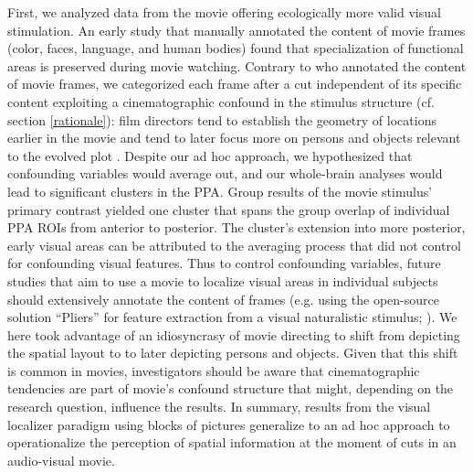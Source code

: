 \documentclass[english]{article}
\begin{document}
First, we analyzed data from the movie offering ecologically more valid visual
stimulation.
%
An early study \citep{bartels2004mapping} that manually annotated the content of
movie frames (color, faces, language, and human bodies) found that
specialization of functional areas is preserved during movie watching.
%
Contrary to \citep{bartels2004mapping} who annotated the content of movie
frames, we categorized each frame after a cut independent of its specific
content
exploiting a cinematographic confound in the stimulus structure (cf. section
\ref{rationale}):
film directors tend to establish the geometry of locations earlier in the movie
and tend to later focus more on persons and objects relevant to the evolved plot
\citep{brown2012cinematography, mercado2011filmmakers}.
Despite our ad hoc approach, we hypothesized that confounding variables would
average out, and our whole-brain analyses would lead to significant clusters in
the PPA.
Group results of the movie stimulus' primary contrast yielded one cluster that
spans the group overlap of individual PPA ROIs from anterior to posterior.
The cluster's extension into more posterior, early visual areas can be
attributed to the averaging process that did not control for confounding visual
features.
Thus to control confounding variables, future studies that aim to use a movie to
localize visual areas in individual subjects should extensively annotate the
content of frames (e.g.  using the open-source solution ``Pliers'' for feature
extraction from a visual naturalistic stimulus; \citep{mcnamara2017developing}).
We here took advantage of an idiosyncrasy of movie directing to shift from
depicting the spatial layout to to later depicting persons and objects.
Given that this shift is common in movies, investigators should be aware that
cinematographic tendencies are part of movie's confound structure that might,
depending on the research question, influence the results.
In summary, results from the visual localizer paradigm using blocks of pictures
generalize to an ad hoc approach to operationalize the perception of spatial
information at the moment of cuts in an audio-visual movie.
\end{document}
